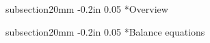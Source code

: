 \documentclass[12pt]{article}
\makeatletter
\renewcommand\section{\@startsection
	{subsection}{2}{0mm}
	{-0.2in}
	{0.05\baselineskip}
	{\normalfont\large\bfseries}}
\makeatother
\begin{document}

\setcounter{page}{1}
\linenumbers


\section*{Overview}


\section*{Balance equations}
\end{document}
